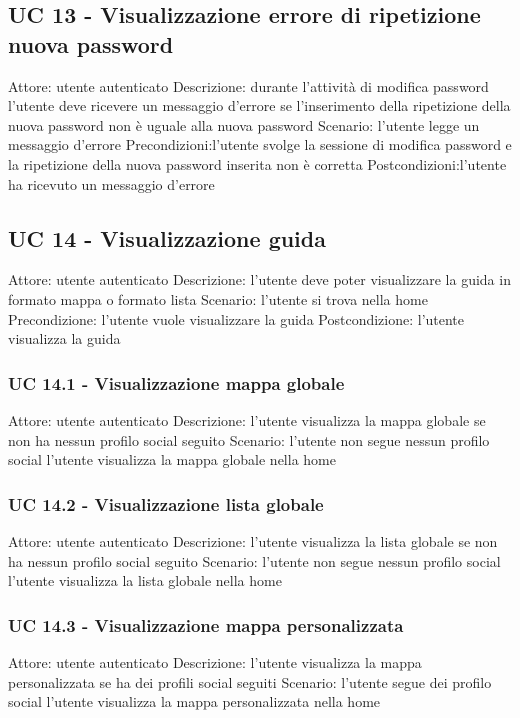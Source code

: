 \subsection{UC 13 - Visualizzazione errore di ripetizione nuova password}
Attore: utente autenticato
Descrizione: durante l’attività di modifica password l’utente deve ricevere un messaggio d’errore se l'inserimento della ripetizione della nuova password non è uguale alla nuova password 
Scenario: l’utente legge un messaggio d’errore
Precondizioni:l’utente svolge la sessione di modifica password e la ripetizione della nuova password inserita non è corretta
Postcondizioni:l’utente ha ricevuto un messaggio d’errore

\subsection{UC 14 - Visualizzazione guida}
Attore: utente autenticato
Descrizione: l’utente deve poter visualizzare la guida in formato mappa o formato lista
Scenario:
l’utente si trova nella home
Precondizione: l’utente vuole visualizzare la guida
Postcondizione: l’utente visualizza la guida

\subsubsection{UC 14.1 - Visualizzazione mappa globale}
Attore: utente autenticato
Descrizione: l’utente visualizza la mappa globale se non ha nessun profilo social seguito
Scenario:
l’utente non segue nessun profilo social
l’utente visualizza la mappa globale nella home

\subsubsection{UC 14.2 - Visualizzazione lista globale}
Attore: utente autenticato
Descrizione: l’utente visualizza la lista globale se non ha nessun profilo social seguito
Scenario:
l’utente non segue nessun profilo social
l’utente visualizza la lista globale nella home

\subsubsection{UC 14.3 - Visualizzazione mappa personalizzata}
Attore: utente autenticato
Descrizione: l’utente visualizza la mappa personalizzata se ha dei profili social seguiti
Scenario:
l’utente segue dei profilo social
l’utente visualizza la mappa personalizzata nella home

